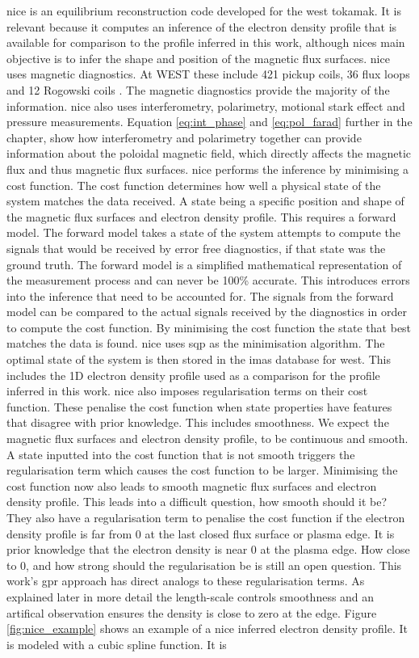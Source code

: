 \gls{nice} is an equilibrium reconstruction code developed for the \gls{west} tokamak. It is relevant because it computes an inference of the electron density profile that is available for comparison to the profile inferred in this work, although \glspl{nice} main objective is to infer the shape and position of the magnetic flux surfaces. \gls{nice} uses magnetic diagnostics. At WEST these include 421 pickup coils, 36 flux loops and 12 Rogowski coils \cite{westmagdiag}. The magnetic diagnostics provide the majority of the information. \gls{nice} also uses interferometry, polarimetry, motional stark effect and pressure measurements. Equation \ref{eq:int_phase} and \ref{eq:pol_farad} further in the chapter, show how interferometry and polarimetry together can provide information about the poloidal magnetic field, which directly affects the magnetic flux and thus magnetic flux surfaces. \gls{nice} performs the inference by minimising a cost function. The cost function determines how well a physical state of the system matches the data received. A state being a specific position and shape of the magnetic flux surfaces and electron density profile. This requires a forward model. The forward model takes a state of the system attempts to compute the signals that would be received by error free diagnostics, if that state was the ground truth. The forward model is a simplified mathematical representation of the measurement process and can never be 100\% accurate. This introduces errors into the inference that need to be accounted for. The signals from the forward model can be compared to the actual signals received by the diagnostics in order to compute the cost function. By minimising the cost function the state that best matches the data is found. \gls{nice} uses \gls{sqp} as the minimisation algorithm. The optimal state of the system is then stored in the \gls{imas} database for \gls{west}. This includes the 1D electron density profile used as a comparison for the profile inferred in this work. \gls{nice} also imposes regularisation terms on their cost function. These penalise the cost function when state properties have features that disagree with prior knowledge. This includes smoothness. We expect the magnetic flux surfaces and electron density profile, to be continuous and smooth. A state inputted into the cost function that is not smooth triggers the regularisation term which causes the cost function to be larger. Minimising the cost function now also leads to smooth magnetic flux surfaces and electron density profile. This leads into a difficult question, how smooth should it be? They also have a regularisation term to penalise the cost function if the electron density profile is far from 0 at the last closed flux surface or plasma edge. It is prior knowledge that the electron density is near 0 at the plasma edge. How close to 0, and how strong should the regularisation be is still an open question. This work's \gls{gpr} approach has  direct analogs to these regularisation terms. As explained later in more detail the length-scale controls smoothness and an artifical observation ensures the density is close to zero at the edge. Figure \ref{fig:nice_example} shows an example of a \gls{nice} inferred electron density profile. It is modeled with a cubic spline function. It is 